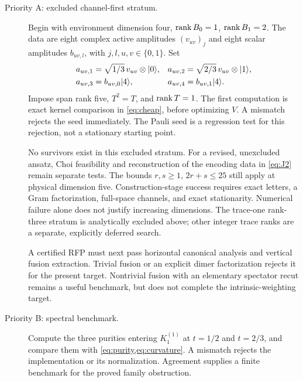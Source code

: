\documentclass[aps,pra,reprint,nofootinbib,onecolumn]{revtex4-2}
\begin{document}
\begin{description}
	\item[Priority A: excluded channel-first stratum.]
	      Begin with environment dimension four,
	      $\operatorname{rank} B_0=1$, $\operatorname{rank} B_1=2$.
	      The data are eight complex active amplitudes
	      $(v_{uv})_j$ and eight scalar amplitudes $b_{uv,l}$,
	      with $j,l,u,v\in\{0,1\}$.
	      Set
	      \begin{align}
		      a_{uv,1} & =\sqrt{1/3}\,v_{uv}\otimes\lvert0\rangle, &
		      a_{uv,2} & =\sqrt{2/3}\,v_{uv}\otimes\lvert1\rangle,
		      \nonumber                                     \\
		      a_{uv,3} & =b_{uv,0}\lvert4\rangle,                  &
		      a_{uv,4} & =b_{uv,1}\lvert4\rangle.
	      \end{align}
	      Impose span rank five, $T^2=T$, and $\operatorname{rank} T=1$.
	      The first computation is exact kernel comparison in
	      \cref{eq:cheap}, before optimizing $V$.
	      A mismatch rejects the seed immediately. The Pauli seed is a
	      regression test for this rejection, not a stationary starting point.

	      No survivors exist in this excluded stratum. For a revised,
	      unexcluded ansatz, Choi feasibility and reconstruction of the
	      encoding data in \cref{eq:J2} remain separate tests. The bounds
	      $r,s\geq1$, $2r+s\leq25$ still apply at physical dimension five.
	      Construction-stage success requires exact letters, a Gram
	      factorization, full-space channels, and exact stationarity.
	      Numerical failure alone does not justify increasing dimensions.
	      The trace-one rank-three stratum is analytically excluded above;
	      other integer trace ranks are a separate, explicitly deferred search.

	      A certified RFP must next pass horizontal canonical analysis and
	      vertical fusion extraction. Trivial fusion or an explicit dimer
	      factorization rejects it for the present target. Nontrivial fusion
	      with an elementary spectator recut remains a useful benchmark, but
	      does not complete the intrinsic-weighting target.

	\item[Priority B: spectral benchmark.]
	      Compute the three purities entering $K_1^{(1)}$ at $t=1/2$ and
	      $t=2/3$, and compare them with
	      \cref{eq:purity,eq:curvature}. A mismatch rejects the implementation
	      or its normalization. Agreement supplies a finite benchmark for the
	      proved family obstruction.


\end{description}
\end{document}
